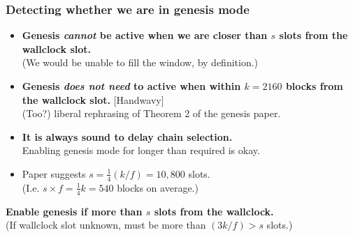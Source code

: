 \documentclass[usenames,dvipsnames,t]{beamer}
\begin{document}
\begin{frame}

\frametitle{Detecting whether we are in genesis mode}

\begin{itemize}
\item \textbf{Genesis \emph{cannot} be active when we are closer than $s$ \alert{slots} from the
wallclock slot.}
\\ (We would be unable to fill the window, by definition.)
\item \textbf{Genesis \emph{does not need} to active when within $k = 2160$ \alert{blocks} from
the wallclock slot.} [Handwavy] \\
(Too?) liberal rephrasing of Theorem 2 of the genesis paper.
\item \textbf{It is always sound to delay chain selection.} \\
Enabling genesis mode for longer than required is okay.
\item Paper suggests $s = \frac{1}{4} (k/f) = 10,800$ slots. \\
(I.e. $s \times f = \frac{1}{4}k = 540$ blocks on average.)
\end{itemize}

\begin{alertblock}{}
\textbf{Enable genesis if more than $s$ slots from the wallclock.} \\
(If wallclock slot unknown,  must be more than $(3k/f) > s$ slots.)
\end{alertblock}

\end{frame}

\end{document}
